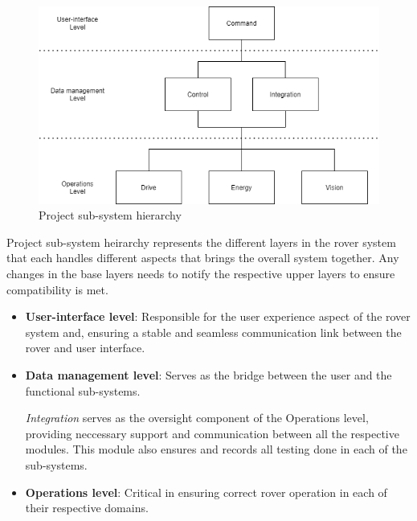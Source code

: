 \documentclass[10pt, a4paper]{article}
\begin{document}
\begin{figure} [h!]
    \centering
    \includegraphics[scale=0.6]{project heirarchy.png}
    \caption{Project sub-system hierarchy}
\end{figure}

Project sub-system heirarchy represents the different layers in the rover system that each handles different aspects that brings the overall system together. Any changes in the base layers needs to notify the respective upper layers to ensure compatibility is met.

\begin{itemize}  
    \item \textbf{User-interface level}: Responsible for the user experience aspect of the rover system and, ensuring a stable and seamless communication link between the rover and user interface. 
    
    \item \textbf{Data management level}: Serves as the bridge between the user and the functional sub-systems. 
    
    \textit{Integration} serves as the oversight component of the Operations level, providing neccessary support and communication between all the respective modules. This module also ensures and records all testing done in each of the sub-systems.

    \item \textbf{Operations level}: Critical in ensuring correct rover operation in each of their respective domains. 
\end{itemize}







\end{document}
